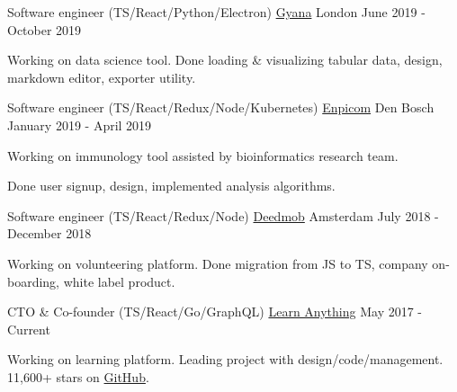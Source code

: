
\begin{cventries}

  \cventry
    {Software engineer (TS/React/Python/Electron)}
    {\href{https://www.gyana.co.uk}{Gyana}}
    {London}
    {June 2019 - October 2019}
     {
      \begin{cvitems}
        \item {Working on data science tool. Done loading \& visualizing tabular data, design, markdown editor, exporter utility.}
      \end{cvitems}
    }

  \cventry
    {Software engineer (TS/React/Redux/Node/Kubernetes)}
    {\href{https://www.enpicom.com}{Enpicom}}
    {Den Bosch}
    {January 2019 - April 2019}
     {
      \begin{cvitems}
        \item {Working on immunology tool assisted by bioinformatics research team.}
        \item {Done user signup, design, implemented analysis algorithms.}
      \end{cvitems}
    }

  \cventry
    {Software engineer (TS/React/Redux/Node)}
    {\href{https://www.deedmob.com}{Deedmob}}
    {Amsterdam}
    {July 2018 - December 2018}
     {
      \begin{cvitems}
        \item {Working on volunteering platform. Done migration from JS to TS, company on-boarding, white label product.}
      \end{cvitems}
    }

  \cventry
    {CTO \& Co-founder (TS/React/Go/GraphQL)}
    {\href{https://learn-anything.xyz}{Learn Anything}}
    {}
    {May 2017 - Current}
     {
      \begin{cvitems}
        \item {Working on learning platform. Leading project with design/code/management. 11,600+ stars on \href{https://github.com/learn-anything/learn-anything}{GitHub}.}
      \end{cvitems}
    }

\end{cventries}
